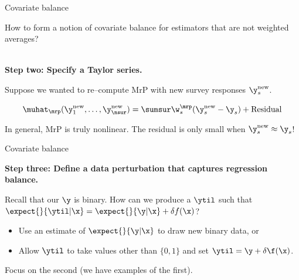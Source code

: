 
\begin{frame}[t]{Covariate balance}


How to form a notion of covariate balance for estimators that are not weighted averages?


\vspace{1em}
\hrulefill\\
\textbf{Step two: Specify a Taylor series.}

\def\new{\mathrm{new}}
Suppose we wanted to re--compute MrP with new
survey responses $\y_s^{\new}$.

$$
\muhat_{\mrp}(\y_1^\new, \ldots, \y_{\nsur}^\new) =
\sumsur \w_s^\mrp (\y_s^\new  - \y_s) + \mathrm{Residual}
$$

In general, MrP is truly nonlinear. The residual is only small when $\y_s^\new \approx \y_s$!


\end{frame}



\begin{frame}[t]{Covariate balance}


\textbf{Step three: Define a data perturbation that captures regression balance.}

Recall that our $\y$ is binary.  How can we produce a $\ytil$ such that
$\expect{}{\ytil \vert \x} = \expect{}{\y \vert \x} + \delta f(\x)$?
%
\begin{itemize}
    \item Use an estimate of $\expect{}{\y \vert \x}$ to draw new binary data, or
    \item Allow $\ytil$ to take values other than $\{0,1\}$ and set
        $\ytil = \y + \delta \f(\x)$.
\end{itemize}
%
Focus on the second (we have examples of the first).

\end{frame}




